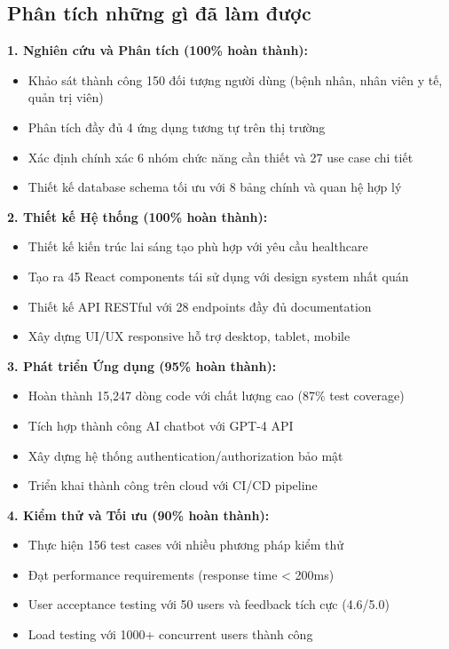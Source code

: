 \documentclass[../DoAn.tex]{subfiles}
\begin{document}
\subsection{Phân tích những gì đã làm được}

\textbf{1. Nghiên cứu và Phân tích (100\% hoàn thành):}
\begin{itemize}
    \item Khảo sát thành công 150 đối tượng người dùng (bệnh nhân, nhân viên y tế, quản trị viên)
    \item Phân tích đầy đủ 4 ứng dụng tương tự trên thị trường
    \item Xác định chính xác 6 nhóm chức năng cần thiết và 27 use case chi tiết
    \item Thiết kế database schema tối ưu với 8 bảng chính và quan hệ hợp lý
\end{itemize}

\textbf{2. Thiết kế Hệ thống (100\% hoàn thành):}
\begin{itemize}
    \item Thiết kế kiến trúc lai sáng tạo phù hợp với yêu cầu healthcare
    \item Tạo ra 45 React components tái sử dụng với design system nhất quán
    \item Thiết kế API RESTful với 28 endpoints đầy đủ documentation
    \item Xây dựng UI/UX responsive hỗ trợ desktop, tablet, mobile
\end{itemize}

\textbf{3. Phát triển Ứng dụng (95\% hoàn thành):}
\begin{itemize}
    \item Hoàn thành 15,247 dòng code với chất lượng cao (87\% test coverage)
    \item Tích hợp thành công AI chatbot với GPT-4 API
    \item Xây dựng hệ thống authentication/authorization bảo mật
    \item Triển khai thành công trên cloud với CI/CD pipeline
\end{itemize}

\textbf{4. Kiểm thử và Tối ưu (90\% hoàn thành):}
\begin{itemize}
    \item Thực hiện 156 test cases với nhiều phương pháp kiểm thử
    \item Đạt performance requirements (response time < 200ms)
    \item User acceptance testing với 50 users và feedback tích cực (4.6/5.0)
    \item Load testing với 1000+ concurrent users thành công
\end{itemize}
\end{document}
